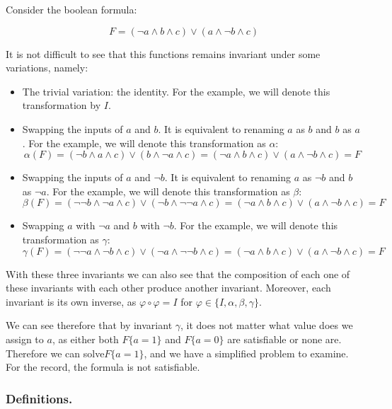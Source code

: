 \begin{example}
Consider the boolean formula:

$$ F = (\neg a \land b  \land c) \lor (a \land \neg b \land c)$$

It is not difficult to see that this functions remains invariant under some variations, namely:

\begin{itemize}
\item The trivial variation: the identity. For the example, we will denote this transformation by  $I$.

\item Swapping the inputs of $a$ and $b$. It is equivalent to renaming $a$ as $b$ and $b$ as $a$. For the example, we will denote this transformation as $\alpha$: 
  $$\alpha(F) = (\neg b \land a  \land c) \lor (b \land \neg a \land c) = (\neg a \land b  \land c) \lor (a \land \neg b \land c) = F$$
\item Swapping the inputs of $a$ and $\neg b$. It is equivalent to renaming $a$ as $\neg b$ and $b$ as $\neg a$. For the example, we will denote this transformation as $\beta$: 
  $$\beta(F) = (\neg \neg b \land \neg a  \land c) \lor (\neg b \land \neg \neg a \land c) = (\neg a \land b  \land c) \lor (a \land \neg b \land c) = F$$

\item Swapping $a$ with $\neg a$ and $b$ with $\neg b$. For the example, we will denote this transformation as $\gamma$: 
  $$\gamma(F) = (\neg \neg a \land \neg b  \land c) \lor (\neg a \land \neg \neg b \land c) = (\neg a \land b  \land c) \lor (a \land \neg b \land c) = F$$
\end{itemize}

With these three invariants we can also see that the composition of each one of these invariants with each other produce another invariant. Moreover, each invariant is its own inverse, as $\varphi \circ \varphi = I $ for $\varphi \in \{I, \alpha, \beta, \gamma\}$.

We can see therefore that by invariant $\gamma$, it does not matter what value does we assign to $a$, as either both $F\{a = 1\}$ and $F\{a=0\}$ are satisfiable or none are. Therefore we can solve$F\{a=1\}$, and we have a simplified problem to examine. For the record, the formula is not satisfiable.

\end{example}


\subsubsection{Definitions.}

